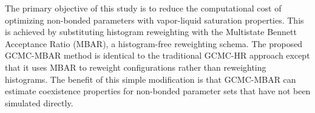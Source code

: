 \documentclass[journal=jced,manuscript=article]{achemso}
\begin{document}




The primary objective of this study is to reduce the computational cost of optimizing non-bonded parameters with vapor-liquid saturation properties. This is achieved by substituting histogram reweighting with the Multistate Bennett Acceptance Ratio (MBAR), \cite{chodera:jctc:2007,shirts-chodera:jcp:2008:mbar} a histogram-free reweighting schema. The proposed GCMC-MBAR method is identical to the traditional GCMC-HR approach except that it uses MBAR to reweight configurations rather than reweighting histograms. The benefit of this simple modification is that GCMC-MBAR can estimate coexistence properties for non-bonded parameter sets that have not been simulated directly. 
\end{document}
